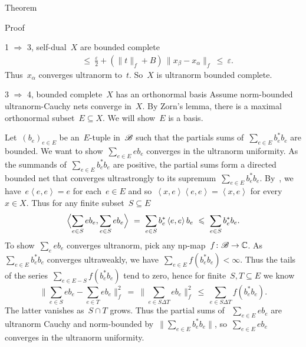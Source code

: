 \documentclass[b]{subfiles}
\begin{document}
\begin{parsec}
\begin{point}{Theorem}
\begin{point}{Proof}
\begin{point}{1 $\Rightarrow$ 3, self-dual~$X$ are bounded complete}
\begin{align*}
    & \ \leq\  \frac{\varepsilon}{2}
    + (\| t\|_f + B) \,\|x_\beta - x_\alpha\|_f \ \leq\  \varepsilon.
\end{align*}
Thus~$x_\alpha$ converges ultranorm to~$t$.
So~$X$ is ultranorm bounded complete.
\end{point}
\begin{point}{3
    $\Rightarrow$ 4, bounded complete~$X$ has an orthonormal basis}
    Assume norm-bounded ultranorm-Cauchy nets converge in~$X$.
By Zorn's lemma, there is a maximal orthonormal subset~$E \subseteq X$.
We will show~$E$ is a basis.

Let~$(b_e)_{e \in E}$ be an~$E$-tuple in~$\scrB$
such that the partials sums of~$\sum_{e \in E} b_e^*b_e$ are bounded.
We want to show~$\sum_{e \in E} e b_e$ converges in the ultranorm
    uniformity.
As the summands of~$\sum_{e \in E}b_e^*b_e$ are positive,
    the partial sums form a directed bounded net
    that converges ultrastrongly
    to its supremum~$\sum_{e \in E} b_e^*b_e$.
By~,
    we have~$e \left<e,e\right> = e$ for each~$e \in E$
    and so~$\left<x,e\right>\left<e,e\right> = \left<x,e\right>$
    for every~$x \in X$.
Thus for any finite subset~$S \subseteq E$
\begin{equation*}
    \Bigl<\sum_{e \in S} eb_e, \sum_{e \in S} eb_e\Bigr>
    \ =\  \sum_{e \in S} b_e^* \left<e,e\right>b_e
    \ \leq\  \sum_{e \in S} b_e^*b_e.
\end{equation*}
To show~$\sum_e eb_e$ converges ultranorm,
    pick any np-map~$f\colon \scrB \to \C$.
As~$\sum_{e \in E} b^*_eb_e$ converges ultraweakly,
we have~$\sum_{e \in E} f(b^*_eb_e) < \infty$.
Thus the tails of the series~$\sum_{e \in E - S} f(b_e^*b_e)$ tend to zero, hence for finite~$S,T\subseteq E$ we know
\begin{equation*}
    \bigl\| \sum_{e \in S} eb_e - \sum_{e\in T} eb_e \bigr\|_f^2
        \ =\  \bigl\| \sum_{e \in S\Delta T} eb_e  \bigr\|_f^2
        \ \leq \ \sum_{e \in S\Delta T} f(b_e^*b_e).
\end{equation*}
The latter vanishes as~$S \cap T$ grows.
Thus the partial sums of ~$\sum_{e \in E} eb_e$ are ultranorm Cauchy
and norm-bounded by~$\| \sum_{e \in E} b_e^*b_e \|$,
so~$\sum_{e \in E} eb_e$ converges in the ultranorm uniformity.


\end{point}
\end{point}
\end{point}
\end{parsec}
\end{document}
